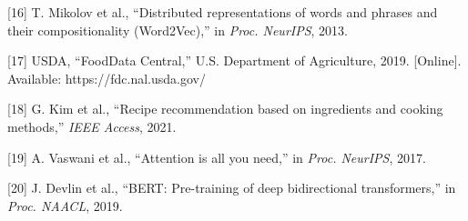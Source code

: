\documentclass[
  10pt,
]{article}
\begin{document}
{[}16{]} T. Mikolov et al., ``Distributed representations of words and
phrases and their compositionality (Word2Vec),'' in \emph{Proc.
NeurIPS}, 2013.

{[}17{]} USDA, ``FoodData Central,'' U.S. Department of Agriculture,
2019. {[}Online{]}. Available: https://fdc.nal.usda.gov/

{[}18{]} G. Kim et al., ``Recipe recommendation based on ingredients and
cooking methods,'' \emph{IEEE Access}, 2021.

{[}19{]} A. Vaswani et al., ``Attention is all you need,'' in
\emph{Proc. NeurIPS}, 2017.

{[}20{]} J. Devlin et al., ``BERT: Pre-training of deep bidirectional
transformers,'' in \emph{Proc. NAACL}, 2019.
\end{document}
